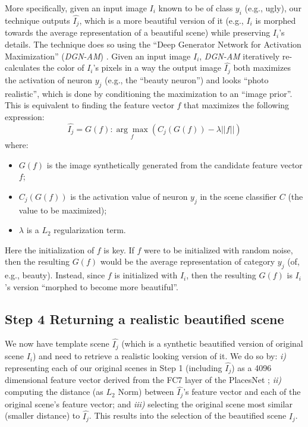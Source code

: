 More specifically, given an input image $I_i$ known to be of class $y_i$  (e.g., ugly), our technique outputs  $\hat{I_j}$, which is a more beautiful version of it (e.g., $I_i$ is morphed  towards the average representation of a beautiful scene) while preserving $I_i$'s details. The technique does so using the ``Deep Generator Network for Activation Maximization'' (\emph{DGN-AM}) \cite{nguyen2016synthesizing}. Given an input image $I_i$, \emph{DGN-AM} iteratively re-calculates the color of $I_i$'s pixels in  a way  the output image $\hat{I_j}$  both maximizes  the  activation of neuron $y_j$ (e.g., the ``beauty neuron'') and looks ``photo realistic'',  which is done by conditioning the maximization to an ``image prior''. This is equivalent to finding the feature vector $f$ that maximizes the following expression:
\begin{equation}
\hat{I_j} =G( f ) : \underset{f}{\arg\max}(C_{j}(G(f))-\lambda||f||)
\end{equation}
where:
\begin{itemize}
\item $G(f)$ is the image synthetically generated from the candidate feature vector $f$;
\item $C_j(G(f))$ is the activation value of neuron $y_j$ in the scene classifier $C$ (the value to be maximized);
\item $\lambda$ is a $L_2$ regularization term.
\end{itemize}
Here the initialization of $f$ is key. If $f$ were to be initialized with random noise, then the resulting $G(f)$ would be the average representation of category $y_j$ (of, e.g., beauty). Instead, since $f$ is initialized with $I_i$, then the resulting $G(f)$ is $I_i$'s version ``morphed to become more beautiful''.

\subsection*{Step 4 Returning a realistic beautified scene}
 We now have template scene $\hat{I_j}$ (which is a synthetic beautified version of original scene $I_i$) and need to retrieve a realistic looking version of it. We do so by: \emph{i)} representing each of our original scenes in Step 1 (including $\hat{I_j}$) as a 4096 dimensional feature vector derived from the FC7 layer of the PlacesNet \cite{zhou2014learning}; \emph{ii)} computing the distance (as $L_2$ Norm) between $\hat{I_j}$'s feature vector and each of the original scene's feature vector; and \emph{iii)} selecting the original scene most similar (smaller distance) to $\hat{I_j}$. This results into the selection of the beautified scene $I_j$.
 
